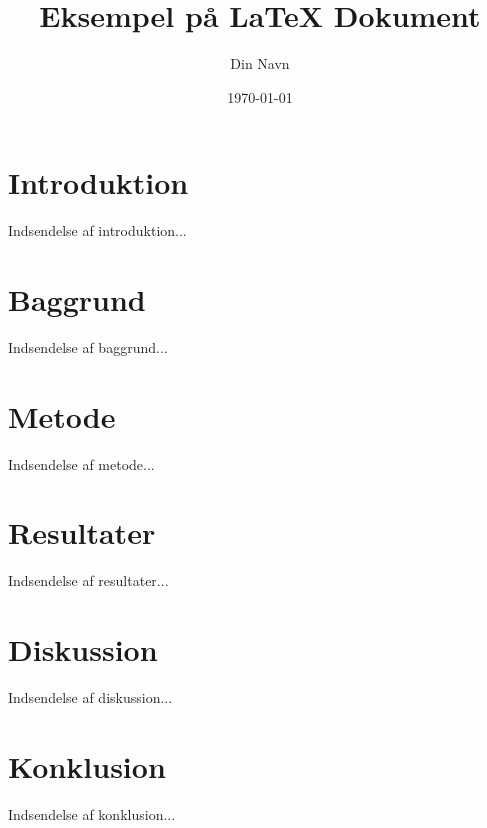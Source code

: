 \documentclass[a4paper,12pt]{article}
\begin{document}
    \title{Eksempel på LaTeX Dokument}
    \author{Din Navn}
    \date{\today}
    \maketitle

    \tableofcontents
    \newpage

    \section{Introduktion}
    Indsendelse af introduktion...

    \section{Baggrund}
    Indsendelse af baggrund...

    \section{Metode}
    Indsendelse af metode...

    \section{Resultater}
    Indsendelse af resultater...

    \section{Diskussion}
    Indsendelse af diskussion...

    \section{Konklusion}
    Indsendelse af konklusion...
\end{document}
